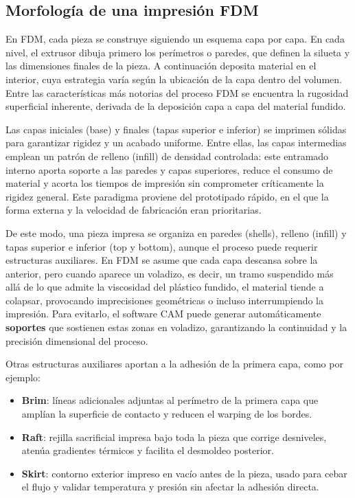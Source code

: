 \subsection{Morfología de una impresión FDM}

En FDM, cada pieza se construye siguiendo un esquema capa por capa. En cada nivel, el extrusor dibuja primero los perímetros o paredes, que definen la silueta y las dimensiones finales de la pieza. A continuación deposita material en el interior, cuya estrategia varía según la ubicación de la capa dentro del volumen. Entre las características más notorias del proceso FDM se encuentra la rugosidad superficial inherente, derivada de la deposición capa a capa del material fundido.

Las capas iniciales (base) y finales (tapas superior e inferior) se imprimen sólidas para garantizar rigidez y un acabado uniforme. Entre ellas, las capas intermedias emplean un patrón de relleno (infill) de densidad controlada: este entramado interno aporta soporte a las paredes y capas superiores, reduce el consumo de material y acorta los tiempos de impresión sin comprometer críticamente la rigidez general. Este paradigma proviene del prototipado rápido, en el que la forma externa y la velocidad de fabricación eran prioritarias.

De este modo, una pieza impresa se organiza en paredes (shells), relleno (infill) y tapas superior e inferior (top y bottom), aunque el proceso puede requerir estructuras auxiliares. En FDM se asume que cada capa descansa sobre la anterior, pero cuando aparece un voladizo, es decir, un tramo suspendido más allá de lo que admite la viscosidad del plástico fundido, el material tiende a colapsar, provocando imprecisiones geométricas o incluso interrumpiendo la impresión. Para evitarlo, el software CAM puede generar automáticamente \textbf{soportes} que sostienen estas zonas en voladizo, garantizando la continuidad y la precisión dimensional del proceso.

Otras estructuras auxiliares aportan a la adhesión de la primera capa, como por ejemplo:

\begin{itemize}
  \item \textbf{Brim}: líneas adicionales adjuntas al perímetro de la primera capa que amplían la superficie de contacto y reducen el warping de los bordes.  
  \item \textbf{Raft}: rejilla sacrificial impresa bajo toda la pieza que corrige desniveles, atenúa gradientes térmicos y facilita el desmoldeo posterior.  
  \item \textbf{Skirt}: contorno exterior impreso en vacío antes de la pieza, usado para cebar el flujo y validar temperatura y presión sin afectar la adhesión directa.  
\end{itemize}

